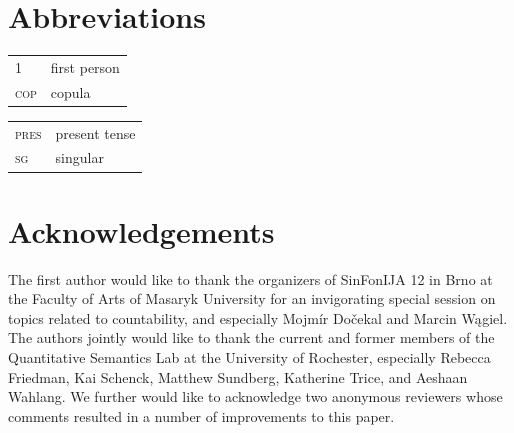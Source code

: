 \documentclass[output=paper]{langscibook}
\begin{document}



\section*{Abbreviations}

\begin{tabularx}{.5\textwidth}{@{}lX@{}}
\textsc{1}&first person\\
\textsc{cop}&{copula}\\
\end{tabularx}%
\begin{tabularx}{.5\textwidth}{@{}lX@{}}
\textsc{pres}&{present tense}\\
\textsc{sg}&singular\\
\end{tabularx}

\fi 

\section*{Acknowledgements}
The first author would like to thank the organizers of SinFonIJA 12 in Brno at the Faculty of Arts of Masaryk University for an invigorating special session on topics related to countability, and especially Mojmír Dočekal   and Marcin Wągiel.  The authors jointly would like to thank the current and former members of the Quantitative Semantics Lab at the University of Rochester, especially  Rebecca Friedman, Kai Schenck, Matthew Sundberg, Katherine Trice, and Aeshaan Wahlang. We further would like to acknowledge two anonymous reviewers whose comments resulted in a number of improvements to this paper.

{}
\end{document}

